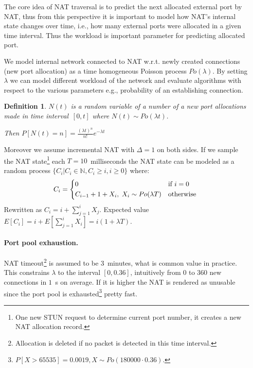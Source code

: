 \documentclass[twoside]{article}
\newtheorem{mydef}{Definition}
\begin{document}
\begin{multicols}{2}
The core idea of NAT traversal is to predict the next allocated external port by NAT, thus from this perspective 
it is important to model how NAT's internal state changes over time, i.e., how many external ports 
were allocated in a given time interval. Thus the workload is important parameter for predicting allocated port.

We model internal network connected to NAT w.r.t. newly created connections (new port allocation) as a 
time homogeneous Poisson process $Po(\lambda)$. By setting $\lambda$ we can model 
different workload of the network and evaluate algorithms with respect to the various parameters e.g., 
probability of an establishing connection. 


\begin{mydef}
$N(t)$ is a random variable of a number of a new port allocations made in time 
interval~$[0,t]$ where $N(t) \sim Po(\lambda t)$. \\ 
                                                      
\begin{center}                                                     
Then $P[N(t)=n] = \frac{(\lambda t)^n}{n!} e^{-\lambda t}$
\end{center}
\end{mydef}

Moreover we assume incremental NAT with $\Delta=1$ on both sides. If we sample the NAT 
state\footnote{One new STUN request to determine current port number, it creates a new NAT allocation record.}
each $T=10$~milliseconds the NAT state can be modeled as a random process $\{C_i | C_i \in \mathbb{N}, C_i \geq i, i\geq0\}$ where:
\[
C_i = \begin{dcases*}
         0 & if $i=0$ \\
         C_{i-1} + 1 + X_i, \; X_i \sim Po(\lambda T) & otherwise 
        \end{dcases*}
\]
Rewritten as $C_i = i + \sum_{j=1}^{i}X_j$. Expected value $E[C_i] = i + E[\sum_{j=1}^{i}X_i] = i (1+\lambda T)$.

\paragraph{Port pool exhaustion.} NAT timeout\footnote{Allocation is deleted if no packet is detected in this time interval.} is assumed to be 3~minutes, 
what is common value in practice. This constrains $\lambda$ to the interval $[0, 0.36]$, intuitively from $0$ to $360$ new connections in $1$~s on average. 
If it is higher the NAT is rendered as unusable since the port pool is exhausted\footnote{$P[X > 65535] = 0.0019, X \sim Po(180000 \cdot 0.36)$.} pretty fast.


\end{multicols}
\end{document}
